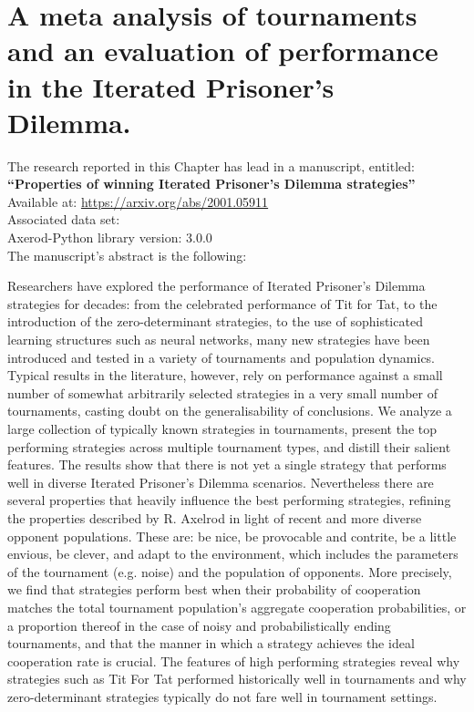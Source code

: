 \chapter{A meta analysis of tournaments and an evaluation of performance in the
Iterated Prisoner's Dilemma.}\label{chapter:meta_tournaments}

\begin{center}
    The research reported in this Chapter has lead in a manuscript, entitled: \\
    \textbf{``Properties of winning Iterated Prisoner's Dilemma strategies''} \\
    Available at: \url{https://arxiv.org/abs/2001.05911} \\
    Associated data set: \cite{Glynatsi_2019_metatournament} \\
    Axerod-Python library version: 3.0.0 \\ \vspace{.5cm}
    The manuscript's abstract is the following:
\end{center}

Researchers have explored the performance of Iterated Prisoner's Dilemma strategies
for decades: from the celebrated performance of Tit for Tat, to the
introduction of the zero-determinant strategies, to the use of sophisticated learning
structures such as neural networks, many new strategies have been introduced and tested
in a variety of tournaments and population dynamics. Typical results in the literature,
however, rely on performance against a small number of somewhat arbitrarily selected
strategies in a very small number of tournaments, casting doubt on the generalisability
of conclusions. We analyze a large collection of \numberofstrategies typically known
strategies in \numberofalltournaments tournaments, present the top performing strategies across multiple
tournament types, and distill their salient features. The results show that there is not yet a single
strategy that performs well in diverse Iterated Prisoner's Dilemma scenarios.
Nevertheless there are several properties that heavily influence the best performing
strategies, refining the properties described by R. Axelrod in light of
recent and more diverse opponent populations. These are: be nice, be provocable and contrite,
be a little envious, be clever, and adapt to the environment, which includes the parameters
of the tournament (e.g. noise) and the population of opponents. More precisely,
we find that strategies perform best when their probability of cooperation
matches the total tournament population's aggregate cooperation probabilities,
or a proportion thereof in the case of noisy and probabilistically ending tournaments,
and that the manner in which a strategy achieves the ideal cooperation rate is crucial.
The features of high performing strategies reveal why strategies such as Tit For Tat
performed historically well in tournaments and why zero-determinant strategies
typically do not fare well in tournament settings.


